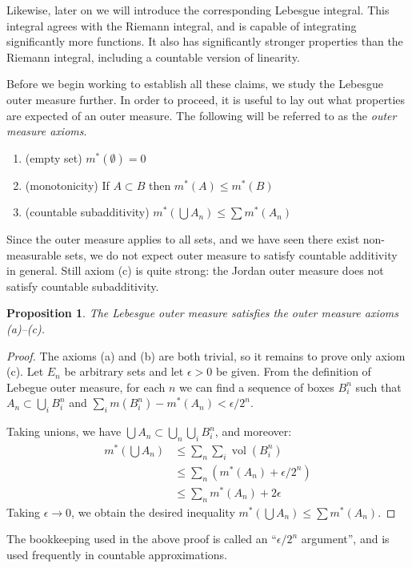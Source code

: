 \documentclass[10pt,oneside]{amsbook}
\DeclareMathOperator{\vol}{vol}
\theoremstyle{definition}
\theoremstyle{plain}
\newtheorem{prop}[thm]{Proposition}
\theoremstyle{definition}
\theoremstyle{remark}
\numberwithin{equation}{section}
\numberwithin{figure}{section}
\begin{document}
Likewise, later on we will introduce the corresponding Lebesgue integral. This integral agrees with the Riemann integral, and is capable of integrating significantly more functions. It also has significantly stronger properties than the Riemann integral, including a countable version of linearity.

Before we begin working to establish all these claims, we study the Lebesgue outer measure further. In order to proceed, it is useful to lay out what properties are expected of an outer measure. The following will be referred to as the \emph{outer measure axioms}.
\begin{enumerate}
\item (empty set) $m^*(\emptyset)=0$
\item (monotonicity) If $A\subset B$ then $m^*(A)\leq m^*(B)$
\item (countable subadditivity) $m^*(\bigcup A_n)\leq\sum m^*(A_n)$
\end{enumerate}
Since the outer measure applies to all sets, and we have seen there exist non-measurable sets, we do not expect outer measure to satisfy countable additivity in general. Still axiom (c) is quite strong: the Jordan outer measure does not satisfy countable subadditivity.

\begin{prop}
  The Lebesgue outer measure satisfies the outer measure axioms (a)--(c).
\end{prop}

\begin{proof}
  The axioms (a) and (b) are both trivial, so it remains to prove only axiom (c). Let $E_n$ be arbitrary sets and let $\epsilon>0$ be given. From the definition of Lebegue outer measure, for each $n$ we can find a sequence of boxes $B_i^n$ such that $A_n\subset\bigcup_iB_i^n$ and $\sum_im(B_i^n)-m^*(A_n)<\epsilon/2^n$.

  Taking unions, we have $\bigcup A_n\subset\bigcup_n\bigcup_iB_i^n$, and moreover:
  \begin{align*}
    m^*(\bigcup A_n)&\leq\sum_n\sum_i\vol(B_i^n)\\
                    &\leq\sum_n\left(m^*(A_n)+\epsilon/2^n\right)\\
                    &\leq\sum_nm^*(A_n)+2\epsilon
  \end{align*}
  Taking $\epsilon\to0$, we obtain the desired inequality $m^*(\bigcup A_n)\leq\sum m^*(A_n)$.
\end{proof}

The bookkeeping used in the above proof is called an ``$\epsilon/2^n$ argument'', and is used frequently in countable approximations.
\end{document}
